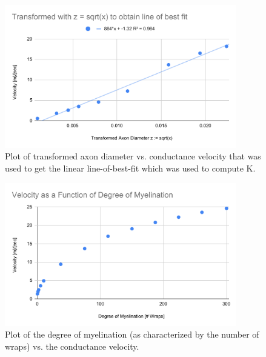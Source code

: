 \documentclass[12pt]{article}
\begin{document}
\begin{figure}[H]
\centering
\includegraphics[width=0.9\textwidth]{Results/1a-2}
\caption{\label{fig:P1a2} Plot of transformed axon diameter vs. conductance velocity that was used to get the linear line-of-best-fit which was used to compute K.}
\end{figure}





 







\begin{figure}[H]
\centering
\includegraphics[width=0.9\textwidth]{Results/2a}
\caption{\label{fig:P2} Plot of the degree of myelination (as characterized by the number of wraps) vs. the conductance velocity.}
\end{figure}
\end{document}
